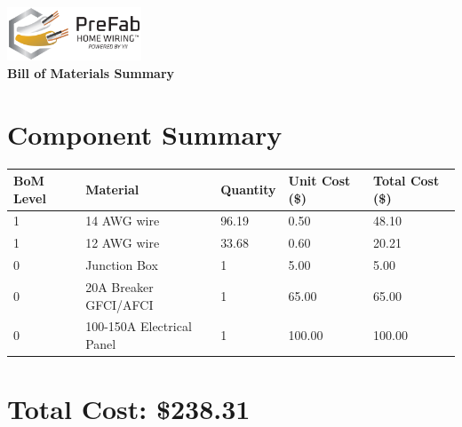 \documentclass{article}
\begin{document}
\begin{center}
\includegraphics[width=0.3\textwidth]{logo.png}\\[1em]
{\LARGE \textbf{Bill of Materials Summary}}\\[0.5em]
\end{center}
\vspace{1.5em}
\section*{Component Summary}
\begin{tabular}{lllll}
\toprule
\textbf{BoM Level} & \textbf{Material} & \textbf{Quantity} & \textbf{Unit Cost (\$)} & \textbf{Total Cost (\$)} \\
\midrule
1 & 14 AWG wire & 96.19 & 0.50 & 48.10 \\
1 & 12 AWG wire & 33.68 & 0.60 & 20.21 \\
0 & Junction Box & 1 & 5.00 & 5.00 \\
0 & 20A Breaker GFCI/AFCI & 1 & 65.00 & 65.00 \\
0 & 100-150A Electrical Panel & 1 & 100.00 & 100.00 \\
\bottomrule
\end{tabular}

\section*{Total Cost: \$238.31}
\end{document}
